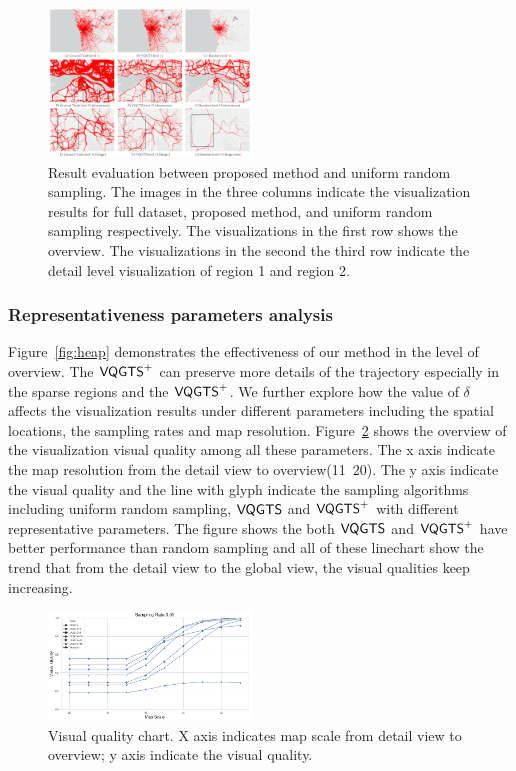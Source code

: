 \begin{figure}[t]
	\centering
	\includegraphics[width=0.48\textwidth]{pictures/experiment_study/Mehtod_resolution_study.pdf}
	\vspace{-5mm}
	\caption{Result evaluation between proposed method and uniform random sampling. The images in the three columns indicate the visualization results for full dataset, proposed method, and uniform random sampling respectively. The visualizations in the first row shows the overview. The visualizations in the second the third row indicate the detail level visualization of region 1 and region 2. }
	\vspace{-5mm}
	\label{fig:random_proposed}
\end{figure}

\subsubsection{Representativeness parameters analysis}
Figure~\ref{fig:heap} demonstrates the effectiveness of our method in the level of overview. The $\mathsf{VQGTS}^{+}$ can preserve more details of the trajectory especially in the sparse regions and the $\mathsf{VQGTS}^{+}$. We further explore how the value of $\delta$ affects the visualization results under different parameters including the spatial locations, the sampling rates and map resolution. Figure~\ref{fig:quality_chart} shows the overview of the visualization visual quality among all these parameters. The x axis indicate the map resolution from the detail view to overview(11~20). The y axis indicate the visual quality and the line with glyph indicate the sampling algorithms including uniform random sampling, $\mathsf{VQGTS}$ and $\mathsf{VQGTS}^{+}$ with different representative parameters. The figure shows the both $\mathsf{VQGTS}$ and $\mathsf{VQGTS}^{+}$ have better performance than random sampling and all of these linechart show the trend that from the detail view to the global view, the visual qualities keep increasing. 


\begin{figure}[t]
	\centering
	\vspace{2mm}
	\includegraphics[width=0.48\textwidth]{pictures/experiment_study/quanlity.png}
	\caption{Visual quality chart. X axis indicates map scale from detail view to overview; y axis indicate the visual quality. }
	\vspace{0mm}
	\label{fig:quality_chart}
\end{figure}

